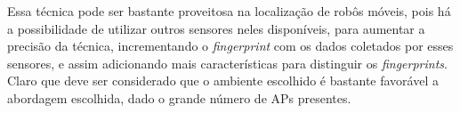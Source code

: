       Essa técnica pode ser bastante proveitosa na localização de robôs móveis, pois há 
      a possibilidade de utilizar outros sensores neles disponíveis, para aumentar a precisão
      da técnica, incrementando o \textit{fingerprint} com os dados coletados por 
      esses sensores, e assim adicionando mais características para distinguir os \textit{fingerprints}.
      Claro que deve ser considerado que o ambiente escolhido é bastante favorável a abordagem escolhida, dado
      o grande número de APs presentes.
      

  
